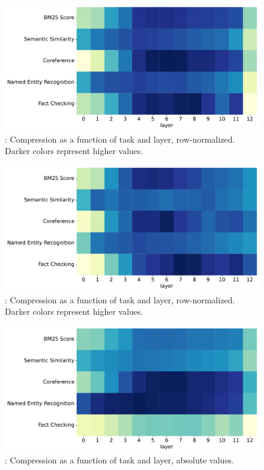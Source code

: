 \begin{figure}
    \label{fig:heatmap_comp_passage}
    \includegraphics[width=\textwidth]{gfx/probing/heatmap_compression_passage}
    \caption{: Compression as a function of task and layer, row-normalized. Darker colors represent higher values.}
\end{figure}

\begin{figure}
    \label{fig:heatmap_comp_base}
    \includegraphics[width=\textwidth]{gfx/probing/heatmap_compression_base}
    \caption{: Compression as a function of task and layer, row-normalized. Darker colors represent higher values.}
\end{figure}


\begin{figure}
    \centering
    \includegraphics[width=\textwidth]{gfx/probing/abs_heatmap_compression_passage}
    \caption{: Compression as a function of task and layer, absolute values.}
\end{figure}

